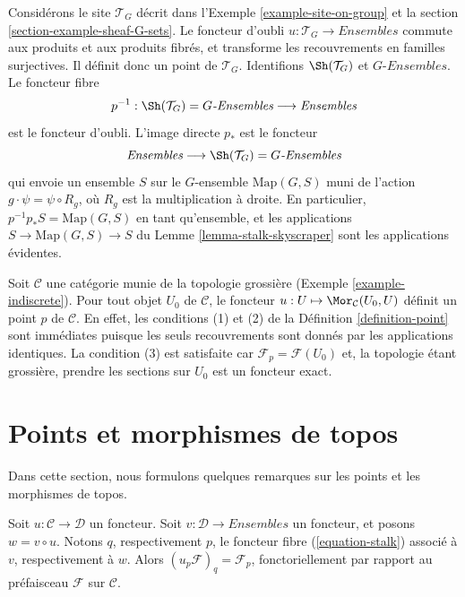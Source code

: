 \begin{example}
\label{example-point-G-sets}
Considérons le site $\mathcal{T}_G$ décrit dans
l’Exemple \ref{example-site-on-group} et la
section \ref{section-example-sheaf-G-sets}.
Le foncteur d’oubli $u : \mathcal{T}_G \to \textit{Ensembles}$
commute aux produits et aux produits fibrés, et transforme
les recouvrements en familles surjectives. Il définit donc un point
de $\mathcal{T}_G$. Identifions $\Sh(\mathcal{T}_G)$
et $G\textit{-Ensembles}$. Le foncteur fibre
$$
p^{-1} :
\Sh(\mathcal{T}_G) = G\textit{-Ensembles}
\longrightarrow
\textit{Ensembles}
$$
est le foncteur d’oubli. L’image directe $p_*$ est le
foncteur
$$
\textit{Ensembles}
\longrightarrow
\Sh(\mathcal{T}_G) = G\textit{-Ensembles}
$$
qui envoie un ensemble $S$ sur le $G$-ensemble $\text{Map}(G, S)$ muni de
l’action $g \cdot \psi = \psi \circ R_g$, où $R_g$ est la multiplication
à droite. En particulier,
$p^{-1}p_*S = \text{Map}(G, S)$ en tant qu’ensemble, et les applications
$S \to \text{Map}(G, S) \to S$ du
Lemme \ref{lemma-stalk-skyscraper}
sont les applications évidentes.
\end{example}

\begin{example}
\label{example-indiscrete-points}
Soit $\mathcal{C}$ une catégorie munie de la topologie grossière
(Exemple \ref{example-indiscrete}). Pour tout objet $U_0$ de $\mathcal{C}$,
le foncteur $u : U \mapsto \Mor_\mathcal{C}(U_0, U)$ définit un point
$p$ de $\mathcal{C}$. En effet, les conditions (1) et (2) de la
Définition \ref{definition-point} sont immédiates puisque les seuls recouvrements
sont donnés par les applications identiques. La condition (3) est satisfaite car
$\mathcal{F}_p = \mathcal{F}(U_0)$ et, la topologie étant grossière,
prendre les sections sur $U_0$ est un foncteur exact.
\end{example}





\section{Points et morphismes de topos}
\label{section-functorial-points}

\noindent
Dans cette section, nous formulons quelques remarques sur les points et les morphismes
de topos.

\begin{lemma}
\label{lemma-point-functor}
Soit $u : \mathcal{C} \to \mathcal{D}$ un foncteur. Soit
$v : \mathcal{D} \to \textit{Ensembles}$ un foncteur, et posons
$w = v \circ u$. Notons $q$, respectivement $p$, le foncteur fibre
(\ref{equation-stalk}) associé à $v$, respectivement à $w$.
Alors $(u_p\mathcal{F})_q = \mathcal{F}_p$, fonctoriellement par rapport au
préfaisceau $\mathcal{F}$ sur $\mathcal{C}$.
\end{lemma}

